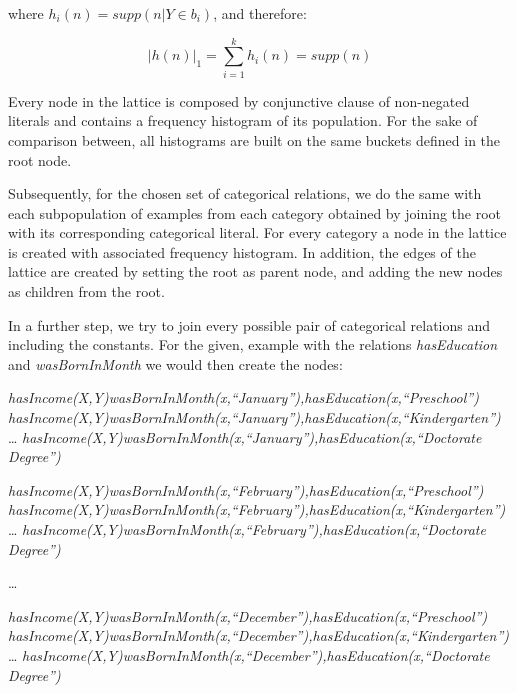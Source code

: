 where $h_i(n)=supp(n|Y \in b_i)$, and therefore:

\begin{equation}
  |h(n)|_1=\sum_{i=1}^{k}h_i(n)=supp(n)
\end{equation}

Every node in the lattice is composed by conjunctive clause of non-negated literals and contains a frequency histogram
of its population. For the sake of comparison between, all histograms are built on the same buckets defined in the root
node. 

Subsequently, for the chosen set of categorical relations, we do the same with each subpopulation of examples from each
category obtained by joining the root with its corresponding categorical literal. For every category a node in
the lattice is created with associated frequency histogram. In addition, the edges of the lattice are created by
setting the root as parent node, and adding the new nodes as children from the root.

In a further step, we try to join every possible pair of categorical relations and including the constants. For the
given, example with the relations \emph{hasEducation} and \emph{wasBornInMonth} we would then create the nodes:

  \emph{hasIncome(X,Y)wasBornInMonth(x,``January''),hasEducation(x,``Preschool'')} \newline
  \emph{hasIncome(X,Y)wasBornInMonth(x,``January''),hasEducation(x,``Kindergarten'')} \newline
  \dots \newline
  \emph{hasIncome(X,Y)wasBornInMonth(x,``January''),hasEducation(x,``Doctorate Degree'')} \newline

  \emph{hasIncome(X,Y)wasBornInMonth(x,``February''),hasEducation(x,``Preschool'')} \newline
  \emph{hasIncome(X,Y)wasBornInMonth(x,``February''),hasEducation(x,``Kindergarten'')} \newline
  \dots \newline
  \emph{hasIncome(X,Y)wasBornInMonth(x,``February''),hasEducation(x,``Doctorate Degree'')} \newline
 
  \dots \newline

  \emph{hasIncome(X,Y)wasBornInMonth(x,``December''),hasEducation(x,``Preschool'')} \newline
  \emph{hasIncome(X,Y)wasBornInMonth(x,``December''),hasEducation(x,``Kindergarten'')} \newline
  \dots \newline
  \emph{hasIncome(X,Y)wasBornInMonth(x,``December''),hasEducation(x,``Doctorate Degree'')} \newline


